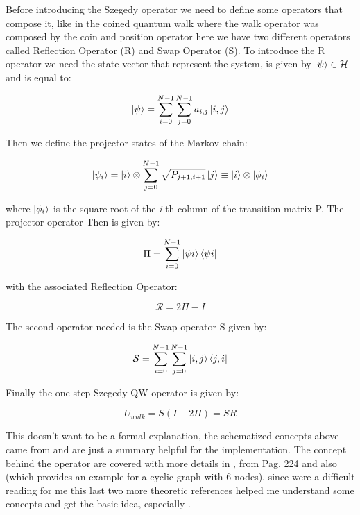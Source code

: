 Before introducing the Szegedy operator we need to define some operators that compose it, like in the coined quantum walk where the 
walk operator was composed by the coin and position operator here we have two different operators called Reflection Operator (R) and Swap Operator (S). To introduce
the R operator we need the state vector that represent the system, is given by $\ket{\psi} \in \mathcal{H}$ and is equal to:

\begin{equation}
    \ket{\psi} = \sum_{i=0}^{N-1}\sum_{j=0}^{N-1} a_{i,j}\ket{i,j} 
\end{equation}

Then we define the projector states of the Markov chain:

\begin{equation}
    \ket{\psi_{i}} = \ket{i} \otimes \sum_{j=0}^{N-1}\sqrt{P_{j+1,i+1}}\ket{j} \equiv \ket{i} \otimes \ket{\phi_{i}}
\end{equation}

where $\ket{\phi_{i}}$ is the square-root of the \textit{i}-th column of the transition matrix P. The projector operator Then is given by:

\begin{equation}
    \Pi = \sum_{i=0}^{N-1}\ket{\psi{i}}\bra{\psi{i}}
\end{equation}

with the associated Reflection Operator:

\begin{equation}
    \mathcal{R} = 2\Pi - I
\end{equation}

The second operator needed is the Swap operator S given by:

\begin{equation}
    \mathcal{S} = \sum_{i=0}^{N-1}\sum_{j=0}^{N-1} \ket{i,j}\bra{j,i} 
\end{equation}

Finally the one-step Szegedy QW operator is given by:

\begin{equation}
    U_{walk} = S(I - 2\varPi) = SR
\end{equation}

This doesn't want to be a formal explanation, the schematized concepts above came from \cite{Loke_2017} and are just a summary helpful for the implementation. 
The concept behind the operator are covered with more details in \cite{c2dacf48ddf341aca084f825d3787894, Loke_2017,1366222}, 
\cite{Portugal2018} from Pag. 224 and also \cite{Wong2017} (which provides an example for a cyclic graph with 6 nodes), since \cite{c2dacf48ddf341aca084f825d3787894, Loke_2017, 1366222}
were a difficult reading for me this last two more theoretic references helped me understand some concepts and get the basic idea, especially \cite{Wong2017}. 

